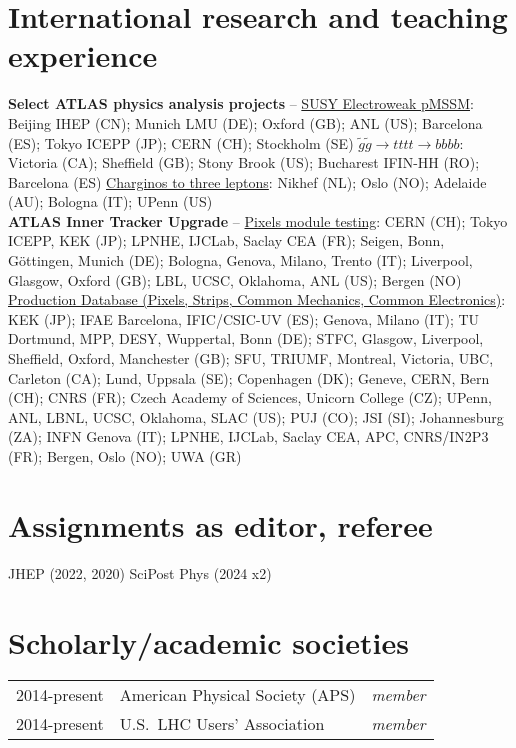 \vspace{-2.0em}\section{International research and teaching experience} \label{sec:international-research-and-teaching-experience}
{
\footnotesize
\textbf{Select ATLAS physics analysis projects} -- \underline{SUSY Electroweak pMSSM}: Beijing IHEP (CN); Munich LMU (DE); Oxford (GB); ANL (US); Barcelona (ES); Tokyo ICEPP (JP); CERN (CH); Stockholm (SE) {\color{red!75!black!50}\large\rmfamily\textbullet} \underline{$\tilde{g}\tilde{g}\to tttt \to bbbb$}: Victoria (CA); Sheffield (GB); Stony Brook (US); Bucharest IFIN-HH (RO); Barcelona (ES) {\color{red!75!black!50}\large\rmfamily\textbullet} \underline{Charginos to three leptons}: Nikhef (NL); Oslo (NO); Adelaide (AU); Bologna (IT); UPenn (US) \\
\textbf{ATLAS Inner Tracker Upgrade} -- \underline{Pixels module testing}:  CERN (CH); Tokyo ICEPP, KEK (JP); LPNHE, IJCLab, Saclay CEA (FR); Seigen, Bonn, G\"{o}ttingen, Munich (DE); Bologna, Genova, Milano, Trento (IT); Liverpool, Glasgow, Oxford (GB); LBL, UCSC, Oklahoma, ANL (US); Bergen (NO) {\color{red!75!black!50}\large\rmfamily\textbullet} \underline{Production Database (Pixels, Strips, Common Mechanics, Common Electronics)}: KEK (JP); IFAE Barcelona, IFIC/CSIC-UV (ES); Genova, Milano (IT); TU Dortmund, MPP, DESY, Wuppertal, Bonn (DE); STFC, Glasgow, Liverpool, Sheffield, Oxford, Manchester (GB); SFU, TRIUMF, Montreal, Victoria, UBC, Carleton (CA); Lund, Uppsala (SE); Copenhagen (DK); Geneve, CERN, Bern (CH); CNRS (FR); Czech Academy of Sciences, Unicorn College (CZ); UPenn, ANL, LBNL, UCSC, Oklahoma, SLAC (US); PUJ (CO); JSI (SI); Johannesburg (ZA); INFN Genova (IT); LPNHE, IJCLab, Saclay CEA, APC, CNRS/IN2P3 (FR); Bergen, Oslo (NO); UWA (GR)
}

\vspace{-2.0em}\section{Assignments as editor, referee} \label{sec:assignments-as-editor-referee}
{
	\footnotesize
	JHEP (2022, 2020) {\color{red!75!black!50}\large\rmfamily\textbullet} SciPost Phys (2024 x2)
}

\vspace{-2.0em}\section{Scholarly/academic societies} \label{sec:scholarly-academic-societies}
\begin{tabular}{r|ll}
	2014-present & American Physical Society (APS) & \textit{member} \\
	2014-present & U.S.~LHC Users' Association     & \textit{member} \\
\end{tabular}

